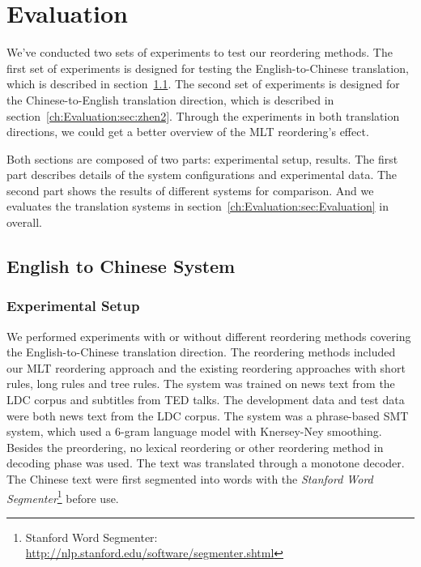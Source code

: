 
\chapter{Evaluation}
\label{ch:Evaluation}

We've conducted two sets of experiments to test our reordering methods. The first set of experiments is designed for testing the English-to-Chinese translation, which is described in section~\ref{ch:Evaluation:sec:enw}. The second set of experiments is designed for the Chinese-to-English translation direction, which is described in section~\ref{ch:Evaluation:sec:zhen2}. Through the experiments in both translation directions, we could get a better overview of the \ac{MLT} reordering's effect.

Both sections are composed of two parts: experimental setup, results. The first part describes details of the system configurations and experimental data. The second part shows the results of different systems for comparison. And we evaluates the translation systems in section~\ref{ch:Evaluation:sec:Evaluation} in overall.


\section{English to Chinese System}
\label{ch:Evaluation:sec:enw}

\subsection{Experimental Setup}
We performed experiments with or without different reordering methods covering the English-to-Chinese translation direction. The reordering methods included our \ac{MLT} reordering approach and the existing reordering approaches with short rules, long rules and tree rules. The system was trained on news text from the \acs{LDC} corpus and subtitles from \acs{TED} talks. The development data and test data were both news text from the \acs{LDC} corpus. The system was a phrase-based \ac{SMT} system, which used a $6$-gram language model with Knersey-Ney smoothing. Besides the preordering, no lexical reordering or other reordering method in decoding phase was used. The text was translated through a monotone decoder. The Chinese text were first segmented into words with the \emph{Stanford Word Segmenter}\footnote{Stanford Word Segmenter: \url{http://nlp.stanford.edu/software/segmenter.shtml}} before use.

